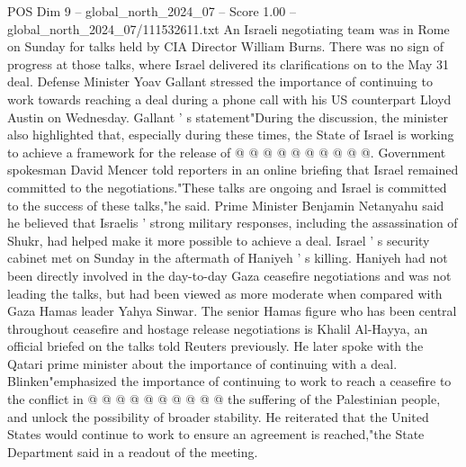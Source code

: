 \begin{textsample}{POS Dim 9 – global\_north\_2024\_07 – Score 1.00 – global\_north\_2024\_07/111532611.txt}
An Israeli negotiating team was in Rome on Sunday for talks held by CIA Director William Burns.
There was no sign of progress at those talks, where Israel delivered its clarifications on to the May 31 deal.
Defense Minister Yoav Gallant stressed the importance of continuing to work towards reaching a deal during a phone call with his US counterpart Lloyd Austin on Wednesday.
Gallant ' s statement"During the discussion, the minister also highlighted that, especially during these times, the State of Israel is working to achieve a framework for the release of @ @ @ @ @ @ @ @ @ @.
Government spokesman David Mencer told reporters in an online briefing that Israel remained committed to the negotiations."These talks are ongoing and Israel is committed to the success of these talks,"he said.
Prime Minister Benjamin Netanyahu said he believed that Israelis ' strong military responses, including the assassination of Shukr, had helped make it more possible to achieve a deal.
Israel ' s security cabinet met on Sunday in the aftermath of Haniyeh ' s killing.
Haniyeh had not been directly involved in the day-to-day Gaza ceasefire negotiations and was not leading the talks, but had been viewed as more moderate when compared with Gaza Hamas leader Yahya Sinwar.
The senior Hamas figure who has been central throughout ceasefire and hostage release negotiations is Khalil Al-Hayya, an official briefed on the talks told Reuters previously.
He later spoke with the Qatari prime minister about the importance of continuing with a deal.
Blinken"emphasized the importance of continuing to work to reach a ceasefire to the conflict in @ @ @ @ @ @ @ @ @ @ the suffering of the Palestinian people, and unlock the possibility of broader stability.
He reiterated that the United States would continue to work to ensure an agreement is reached,"the State Department said in a readout of the meeting.

\end{textsample}
